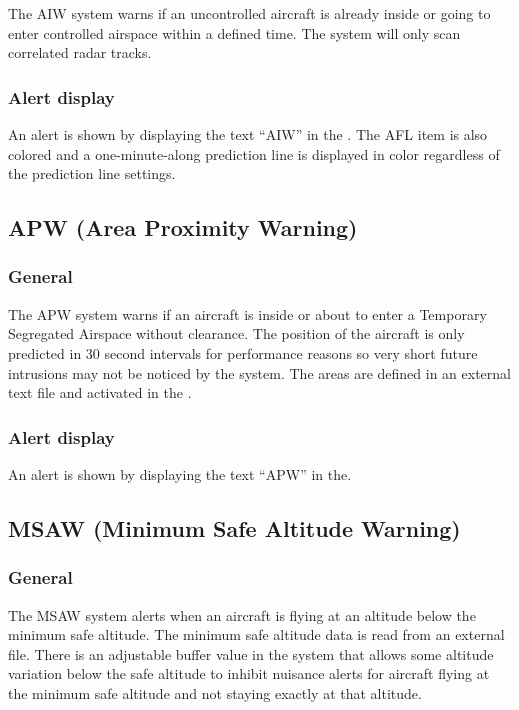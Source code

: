 \documentclass[a4paper,oneside,11pt]{memoir}
\begin{document}
The AIW system warns if an uncontrolled aircraft is already inside or going to enter controlled airspace within a defined time. The system will only scan correlated radar tracks.

\subsubsection*{Alert display}

An alert is shown by displaying the text “AIW” in the . The AFL item is also colored  and a one-minute-along prediction line is displayed in  color regardless of the prediction line settings.

\subsection{APW (Area Proximity Warning)}
\label{tool:APW}
\subsubsection*{General}

The APW system warns if an aircraft is inside or about to enter a Temporary Segregated Airspace without clearance. The position of the aircraft is only predicted in 30 second intervals for performance reasons so very short future intrusions may not be noticed by the system. The areas are defined in an external text file and activated in the .

\subsubsection*{Alert display}

An alert is shown by displaying the text “APW” in the.

\subsection{MSAW (Minimum Safe Altitude Warning)}
\label{tool:MSAW}
\subsubsection*{General}


The MSAW system alerts when an aircraft is flying at an altitude below the minimum safe altitude. The minimum safe altitude data is read from an external file. There is an adjustable buffer value in the system that allows some altitude variation below the safe altitude to inhibit nuisance alerts for aircraft flying at the minimum safe altitude and not staying exactly at that altitude.
\end{document}
